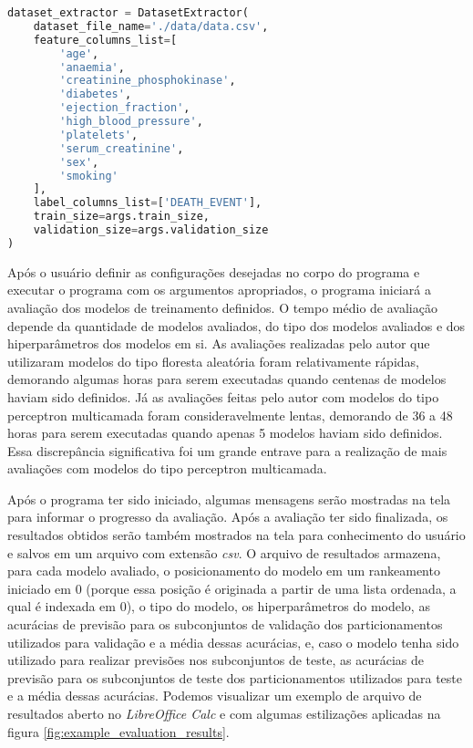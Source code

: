 \lstset{caption=Construção do extrator de conjunto de dados no programa de avaliação dos modelos de treinamento, label=list:main_dataset_extractor}
\begin{lstlisting}[language=python]
dataset_extractor = DatasetExtractor(
    dataset_file_name='./data/data.csv',
    feature_columns_list=[
        'age',
        'anaemia',
        'creatinine_phosphokinase',
        'diabetes',
        'ejection_fraction',
        'high_blood_pressure',
        'platelets',
        'serum_creatinine',
        'sex',
        'smoking'
    ],
    label_columns_list=['DEATH_EVENT'],
    train_size=args.train_size,
    validation_size=args.validation_size
)
\end{lstlisting}

Após o usuário definir as configurações desejadas no corpo do programa e executar o programa com os argumentos apropriados, o programa iniciará a avaliação dos modelos de treinamento definidos. O tempo médio de avaliação depende da quantidade de modelos avaliados, do tipo dos modelos avaliados e dos hiperparâmetros dos modelos em si. As avaliações realizadas pelo autor que utilizaram modelos do tipo floresta aleatória foram relativamente rápidas, demorando algumas horas para serem executadas quando centenas de modelos haviam sido definidos. Já as avaliações feitas pelo autor com modelos do tipo perceptron multicamada foram consideravelmente lentas, demorando de 36 a 48 horas para serem executadas quando apenas 5 modelos haviam sido definidos. Essa discrepância significativa foi um grande entrave para a realização de mais avaliações com modelos do tipo perceptron multicamada.

Após o programa ter sido iniciado, algumas mensagens serão mostradas na tela para informar o progresso da avaliação. Após a avaliação ter sido finalizada, os resultados obtidos serão também mostrados na tela para conhecimento do usuário e salvos em um arquivo com extensão \textit{csv}. O arquivo de resultados armazena, para cada modelo avaliado, o posicionamento do modelo em um rankeamento iniciado em 0 (porque essa posição é originada a partir de uma lista ordenada, a qual é indexada em 0), o tipo do modelo, os hiperparâmetros do modelo, as acurácias de previsão para os subconjuntos de validação dos particionamentos utilizados para validação e a média dessas acurácias, e, caso o modelo tenha sido utilizado para realizar previsões nos subconjuntos de teste, as acurácias de previsão para os subconjuntos de teste dos particionamentos utilizados para teste e a média dessas acurácias. Podemos visualizar um exemplo de arquivo de resultados aberto no \textit{LibreOffice Calc} e com algumas estilizações aplicadas na figura \ref{fig:example_evaluation_results}.

